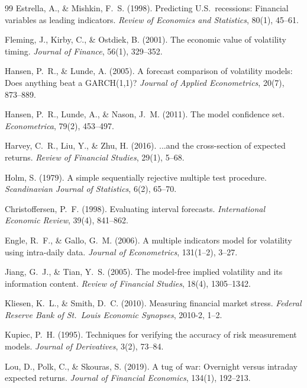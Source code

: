 \documentclass[12pt,a4paper]{article}
\begin{document}
\begin{thebibliography}{99}
Estrella, A., \& Mishkin, F.~S. (1998). Predicting U.S.\ recessions: Financial variables as leading indicators. \textit{Review of Economics and Statistics}, 80(1), 45--61.

Fleming, J., Kirby, C., \& Ostdiek, B. (2001). The economic value of volatility timing. \textit{Journal of Finance}, 56(1), 329--352.

Hansen, P.~R., \& Lunde, A. (2005). A forecast comparison of volatility models: Does anything beat a GARCH(1,1)? \textit{Journal of Applied Econometrics}, 20(7), 873--889.

Hansen, P.~R., Lunde, A., \& Nason, J.~M. (2011). The model confidence set. \textit{Econometrica}, 79(2), 453--497.

Harvey, C.~R., Liu, Y., \& Zhu, H. (2016). ...and the cross-section of expected returns. \textit{Review of Financial Studies}, 29(1), 5--68.

Holm, S. (1979). A simple sequentially rejective multiple test procedure. \textit{Scandinavian Journal of Statistics}, 6(2), 65--70.

Christoffersen, P.~F. (1998). Evaluating interval forecasts. \textit{International Economic Review}, 39(4), 841--862.

Engle, R.~F., \& Gallo, G.~M. (2006). A multiple indicators model for volatility using intra-daily data. \textit{Journal of Econometrics}, 131(1--2), 3--27.

Jiang, G.~J., \& Tian, Y.~S. (2005). The model-free implied volatility and its information content. \textit{Review of Financial Studies}, 18(4), 1305--1342.

Kliesen, K.~L., \& Smith, D.~C. (2010). Measuring financial market stress. \textit{Federal Reserve Bank of St.\ Louis Economic Synopses}, 2010-2, 1--2.

Kupiec, P.~H. (1995). Techniques for verifying the accuracy of risk measurement models. \textit{Journal of Derivatives}, 3(2), 73--84.

Lou, D., Polk, C., \& Skouras, S. (2019). A tug of war: Overnight versus intraday expected returns. \textit{Journal of Financial Economics}, 134(1), 192--213.


\end{thebibliography}
\end{document}
